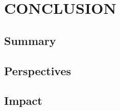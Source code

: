 \documentclass{article}
\begin{document}
\section{CONCLUSION}
\subsection{Summary}
\subsection{Perspectives}
\subsection{Impact}
\blindtext
	
\end{document}
